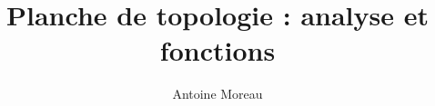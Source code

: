 \documentclass[a4paper,10pt]{article}
\title{Planche de topologie : analyse et fonctions}
\author{Antoine Moreau}
\begin{document}
\maketitle

\begin{abstract}

\end{abstract}





\end{document}

